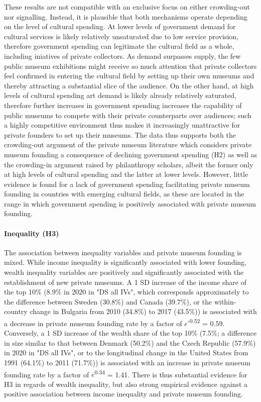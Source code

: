 \documentclass[11pt]{article}
\begin{document}
These results are not compatible with an exclusive focus on either crowding-out nor signalling.
Instead, it is plausible that both mechanisms operate depending on the level of cultural spending.
At lower levels of government demand for cultural services is likely relatively unsaturated due to low service provision, therefore government spending can legitimate the cultural field as a whole, including iniatives of private collectors.
As demand surpasses supply, the few public museum exhibitions might receive so much attention that private collectors feel confirmed in entering the cultural field by setting up their own museums and thereby attracting a substantial slice of the audience.
On the other hand, at high levels of cultural spending art demand is likely already relatively saturated, therefore further increases in government spending increases the capability of public museums to compete with their private counterparts over audiences; such a highly competitive environment thus makes it increasingly unattractive for private founders to set up their museums. 
The data thus supports both the crowding-out argument of the private museum literature which considers private museum founding a consequence of declining government spending (H2) as well as the crowding-in argument raised by philanthropy scholars, albeit the former only at high levels of cultural spending and the latter at lower levels.
However, little evidence is found for a lack of government spending facilitating private museum founding in countries with emerging cultural fields, as these are located in the range in which government spending is positively associated with private museum founding. 

\paragraph*{Inequality (H3)}



The association between inequality variables and private museum founding is mixed.
While income inequality is significantly associated with lower founding, wealth inequality variables are positively and significantly associated with the establishment of new private museums. 
A 1 SD increase of the income share of the top 10\% (8.9\% in 2020 in "DS all IVs", which corresponds approximately to the difference between Sweden (30.8\%) and Canada (39.7\%), or the within-country change in Bulgaria from 2010 (34.8\%) to 2017 (43.5\%)) is associated with a decrease in private museum founding rate by a factor of \(e\)\textsuperscript{-0.52} = 0.59. 
Conversely, a 1 SD increase of the wealth share of the top 10\% (7.5\%; a difference in size similar to that between Denmark (50.2\%) and the Czech Republic (57.9\%) in 2020 in "DS all IVs", or to the longitudinal change in the United States from 1991 (64.1\%) to 2011 (71.7\%)) is associated with an increase in private museum founding rate by a factor of \(e\)\textsuperscript{0.34} = 1.41.
There is thus substantial evidence for H3 in regards of wealth inequality, but also strong empirical evidence against a positive association between income inequality and private museum founding. 
\end{document}
